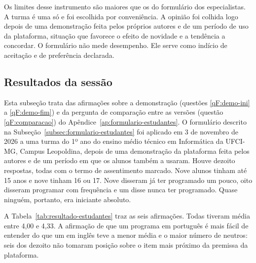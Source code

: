 Os limites desse instrumento são maiores que os do formulário dos especialistas. A turma é uma só e foi escolhida por conveniência. A opinião foi colhida logo depois de uma demonstração feita pelos próprios autores e de um período de uso da plataforma, situação que favorece o efeito de novidade e a tendência a concordar. O formulário não mede desempenho. Ele serve como indício de aceitação e de preferência declarada.

\subsection{Resultados da sessão}
\label{sec:resultado-estudantes}

Esta subseção trata das afirmações sobre a demonstração (questões \ref{qF:demo-ini} a \ref{qF:demo-fim}) e da pergunta de comparação entre as versões (questão \ref{qF:comparacao}) do Apêndice~\ref{ap:formulario-estudantes}. O formulário descrito na Subseção~\ref{subsec:formulario-estudantes} foi aplicado em 3 de novembro de 2026 a uma turma do 1º ano do ensino médio técnico em Informática da UFCI-MG, Campus Leopoldina, depois de uma demonstração da plataforma feita pelos autores e de um período em que os alunos também a usaram. Houve dezoito respostas, todas com o termo de assentimento marcado. Nove alunos tinham até 15 anos e nove tinham 16 ou 17. Nove disseram já ter programado um pouco, oito disseram programar com frequência e um disse nunca ter programado. Quase ninguém, portanto, era iniciante absoluto.

A Tabela~\ref{tab:resultado-estudantes} traz as seis afirmações. Todas tiveram média entre 4,00 e 4,33. A afirmação de que um programa em português é mais fácil de entender do que um em inglês teve a menor média e o maior número de neutros: seis dos dezoito não tomaram posição sobre o item mais próximo da premissa da plataforma.

